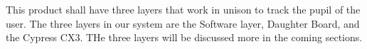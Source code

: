 
This product shall have three layers that work in unison to track the pupil of the user. The three layers in our system are the Software layer, Daughter Board, and the Cypress CX3. THe three layers will be discussed more in the coming sections.